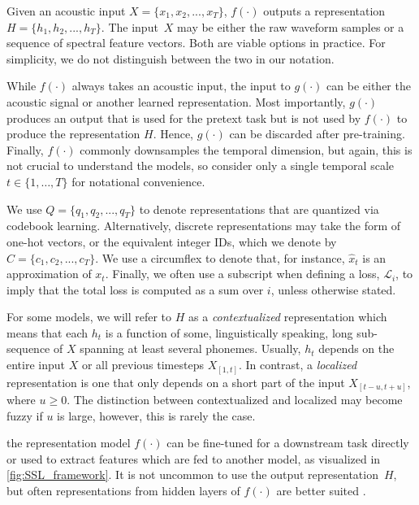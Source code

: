 Given an acoustic input $X =\{x_1,x_2, ..., x_T\}$, $f(\cdot)$ outputs a representation $H =\{h_1,h_2,...,h_T\}$. The input~$X$ may be either the raw waveform samples or a sequence of spectral feature vectors. Both are viable options in practice. For simplicity, we do not distinguish between the two in our notation.  

While $f(\cdot)$ always takes an acoustic input, the input to $g(\cdot)$ can be either the acoustic signal or another learned representation. Most importantly, $g(\cdot)$ produces an output that is used for the pretext task but is not  used by $f(\cdot)$ to produce the representation $H$. Hence, $g(\cdot)$ can be discarded after pre-training. Finally, $f(\cdot)$ commonly downsamples the temporal dimension, but again, this is not crucial to understand the models, so consider only a single temporal scale $t\in\{1,\dots, T\}$ for notational convenience.

We use $Q = \{q_1,q_2, ..., q_T\}$ to denote representations that are quantized via codebook learning. Alternatively, discrete representations may take the form of one-hot vectors, or the equivalent integer IDs, which we denote by $C = \{c_1,c_2, ..., c_T\}$. We use a circumflex to denote that, for instance, $\hat{x}_t$ is an approximation of $x_t$. Finally, we often use a subscript when defining a loss, $\mathcal{L}_i$, to imply that the total loss is computed as a sum over $i$, unless otherwise stated.

For some models, we will refer to $H$ as a \emph{contextualized} representation which means that each $h_t$ is a function of some, linguistically speaking, long sub-sequence of $X$ spanning at least several phonemes. Usually, $h_t$ depends on the entire input $X$ or all previous timesteps $X_{[1,t]}$. In contrast, a \emph{localized} representation is one that only depends on a short part of the input $X_{[t - u,t + u]}$, where $u \geq 0$. The distinction between contextualized and localized may become fuzzy if $u$ is large, however, this is rarely the case.

 the representation model $f(\cdot)$ can be fine-tuned for a downstream task directly or used to extract features which are fed to another model, as visualized in \cref{fig:SSL_framework}. It is not uncommon to use the output representation~$H$, but often representations from hidden layers of $f(\cdot)$ are better suited \cite{pasad2021}.


